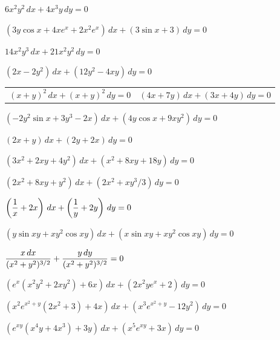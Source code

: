 \begin{exerciselist}
  \item\label{exer:2.5.1} $6x^{2}y^{2}\,dx+4x^{3}y\,dy=0$

  \item\label{exer:2.5.2} $(3y\cos x+4xe^{x}+2x^{2}e^{x})\,dx+(3\sin x+3)\,dy=0$

  \item\label{exer:2.5.3} $14x^{2}y^{3}\,dx+21x^{2}y^{2}\,dy=0$

  \item\label{exer:2.5.4} $(2x-2y^{2})\,dx+(12y^{2}-4xy)\,dy=0$

  \begin{tabular}[t]{@{}p{168pt}@{}p{168pt}}
    \item\label{exer:2.5.5}$(x+y)^{2}\,dx+(x+y)^{2}\,dy=0$ &
    \item\label{exer:2.5.6}$(4x+7y)\,dx+(3x+4y)\,dy=0$
  \end{tabular}

  \item\label{exer:2.5.7} $(-2y^{2}\sin x+3y^{3}-2x)\,dx+(4y\cos x+9xy^{2})\,dy=0$

  \item\label{exer:2.5.8} $(2x+y)\,dx+(2y+2x)\,dy=0$

  \item\label{exer:2.5.9} $(3x^{2}+2xy+4y^{2})\,dx+(x^{2}+8xy+18y)\,dy=0$

  \item\label{exer:2.5.10} $(2x^{2}+8xy+y^{2})\,dx+(2x^{2}+xy^{3}/3)\,dy=0$

  \item\label{exer:2.5.11}
        $\displaystyle{\left(\frac{1}{x}+2x\right)\,dx+ \left(\frac{1}{y}+2y\right)\,dy=0}$

  \item\label{exer:2.5.12} $(y\sin xy+xy^{2}\cos xy)\,dx+(x\sin xy+xy^{2}\cos xy)\,dy=0$

  \item\label{exer:2.5.13}
        $\displaystyle{\frac{x\,dx}{(x^{2}+y^{2})^{3/2}}+\frac{y\,dy}{(x^{2}+y^{2})^{3/2}}=0}$

  \item\label{exer:2.5.14} $\left(e^{x}(x^{2}y^{2}+2xy^{2})+6x\right)\,dx+(2x^{2}ye^{x}+2)\,dy=0$

  \item\label{exer:2.5.15}
        $\left(x^{2}e^{x^{2}+y}(2x^{2}+3)+4x\right)\,dx+(x^{3}e^{x^{2}+y}-12y^{2})\,dy=0$

  \item\label{exer:2.5.16} $\left(e^{xy}(x^{4}y+4x^{3})+3y\right)\,dx+(x^{5}e^{xy}+3x)\,dy=0$


\end{exerciselist}
